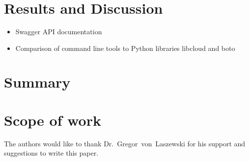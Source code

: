 \section{Results and Discussion}

\begin{itemize}
\item
  Swagger API documentation
\item
  Comparison of command line tools to Python libraries libcloud and boto
\end{itemize}

\section{Summary}

\section{Scope of work}\label{scope-of-work}

\begin{acks}

  The authors would like to thank Dr.~Gregor~von~Laszewski for his
  support and suggestions to write this paper.

\end{acks}


 

